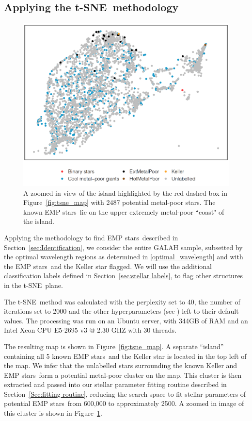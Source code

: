 \documentclass[]{aastex631}
\newcommand{\ts}{t-SNE\xspace}
\newcommand{\emps}{EMP stars\xspace}
\begin{document}
\subsection{Applying the \ts \ methodology}\label{Sec:Application}

\begin{figure}
\includegraphics[width=\linewidth,keepaspectratio]{Plots/Figure5.png}
\caption{A zoomed in view of the island highlighted by the red-dashed box in Figure~\ref{fig:tsne_map} with 2487 potential metal-poor stars. The known \emps \ lie on the upper extremely metal-poor ``coast" of the island.}
\label{fig:tsne_map_zoomed}
\end{figure}

Applying the methodology to find \emps \ described in Section~\ref{sec:Identification}, we consider the entire GALAH sample, subsetted by the optimal wavelength regions as determined in \ref{optimal_wavelength} and with the \emps \ and the Keller star flagged. We will use the additional classification labels defined in Section~\ref{sec:stellar labels}, to flag other structures in the \ts \ plane.

The \ts \ method was calculated with the perplexity set to 40, the number of iterations set to 2000 and the other hyperparameters (see \cite{wattenberg_how_2016}) left to their default values.
The processing was run on an Ubuntu server, with 344GB of RAM and an Intel Xeon CPU E5-2695 v3 @ 2.30 GHZ with 30 threads.

The resulting map is shown in Figure~\ref{fig:tsne_map}.
A separate ``island'' containing all 5 known \emps \ and the Keller star is located in the top left of the map.
We infer that the unlabelled stars surrounding the known Keller and \emps \, form a potential metal-poor cluster on the map. This cluster is then extracted and passed into our stellar parameter fitting routine described in Section~\ref{Sec:fitting routine}, reducing the search space to fit stellar parameters of potential \emps \ from 600,000 to approximately 2500. A zoomed in image of this cluster is shown in Figure~\ref{fig:tsne_map_zoomed}.
\end{document}
